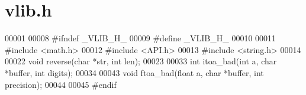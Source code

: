 \section{vlib.\+h}
\label{vlib_8h_source}

\begin{DoxyCode}
00001 
00008 \textcolor{preprocessor}{#ifndef \_VLIB\_H\_}
00009 \textcolor{preprocessor}{#define \_VLIB\_H\_}
00010 
00011 \textcolor{preprocessor}{#include <math.h>}
00012 \textcolor{preprocessor}{#include <API.h>}
00013 \textcolor{preprocessor}{#include <string.h>}
00014 
00022 \textcolor{keywordtype}{void} reverse(\textcolor{keywordtype}{char} *str, \textcolor{keywordtype}{int} len);
00023 
00033 \textcolor{keywordtype}{int} itoa_bad(\textcolor{keywordtype}{int} a, \textcolor{keywordtype}{char} *buffer, \textcolor{keywordtype}{int} digits);
00034 
00043 \textcolor{keywordtype}{void} ftoa_bad(\textcolor{keywordtype}{float} a, \textcolor{keywordtype}{char} *buffer, \textcolor{keywordtype}{int} precision);
00044 
00045 \textcolor{preprocessor}{#endif}
\end{DoxyCode}
